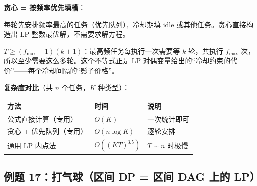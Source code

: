 \documentclass[12pt, a4paper]{ctexart}
\begin{document}
\begin{blackboard}
\textbf{贪心 = 按频率优先填槽}：

每轮先安排频率最高的任务（优先队列），冷却期填 idle 或其他任务。贪心直接构造出 LP 整数最优解，不需要求解方程。

\begin{insight}[对偶下界的直觉]
$T \geq (f_{\max}-1)(k+1)$：最高频任务每执行一次需要等 $k$ 轮，共执行 $f_{\max}$ 次，所以至少需要这么多轮。这个不等式正是 LP 对偶变量给出的``冷却约束的代价''——每个冷却间隔的``影子价格''。
\end{insight}

\textbf{复杂度对比}（共 $n$ 个任务，$K$ 种类型）：

\begin{center}
\begin{tabular}{lll}
\toprule
方法 & 时间 & 说明 \\
\midrule
公式直接计算（专用） & $O(K)$ & 一次统计即可 \\
贪心 + 优先队列（专用） & $O(n\log K)$ & 逐轮安排 \\
通用 LP 内点法 & $O((KT)^{3.5})$ & $T \sim n$ 时极慢 \\
\bottomrule
\end{tabular}
\end{center}

\end{blackboard}

\subsection{例题 17：打气球（区间 DP = 区间 DAG 上的 LP）}
\end{document}
